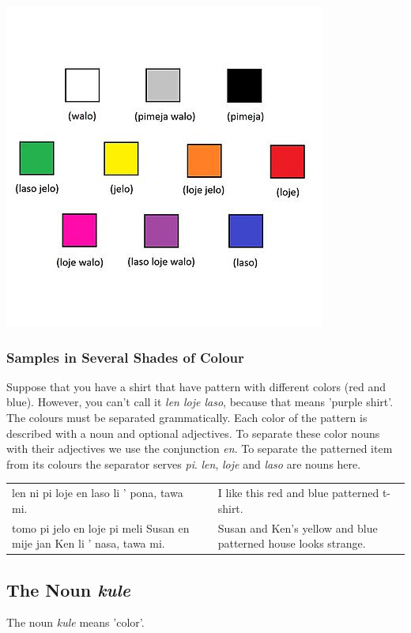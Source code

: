 %
\includegraphics[scale=0.4]{colors}
%
\subsubsection*{Samples in Several Shades of Colour}
%
%
Suppose that you have a shirt that have pattern with different colors (red and blue).
However, you can't call it \textit{len loje laso}, because that means 'purple shirt'.
The colours must be separated grammatically.
Each color of the pattern is described with a noun and optional adjectives.
To separate these color nouns with their adjectives we use the conjunction \textit{en}.
To separate the patterned item from its colours the separator serves \textit{pi}.
\textit{len}, \textit{loje} and \textit{laso} are nouns here.

\begin{supertabular}{p{5,5cm}|ll}
    len ni pi loje en laso li ' pona, tawa mi.                             &  & I like this red and blue patterned t-shirt.                    \\
    tomo pi jelo en loje pi meli Susan en mije jan Ken li ' nasa, tawa mi. &  & Susan and Ken's yellow and blue patterned house looks strange. \\
\end{supertabular}

%
\subsection*{The Noun \textit{kule}}
%
%
The noun \textit{kule} means 'color'.

